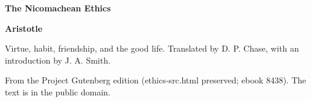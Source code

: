 \documentclass[11pt,letterpaper]{article}
\begin{document}
\color{ink}

\begin{titlepage}
\centering
\vspace*{4em}
{\LARGE\bfseries\color{heading} The Nicomachean Ethics\par}
\vspace{2em}
{\Large\bfseries\color{heading} Aristotle\par}
\vspace{2.5em}
{\itshape\color{subhead}\parbox{0.8\linewidth}{\centering Virtue, habit, friendship, and the good life. Translated by D. P. Chase, with an introduction by J. A. Smith.\par}}
\vfill
{\small From the Project Gutenberg edition (ethics-src.html preserved; ebook 8438). The text is in the public domain.\par}
\vspace{2em}
\end{titlepage}

\tableofcontents


\end{document}
